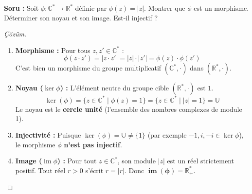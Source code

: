 \documentclass[12pt,a4paper]{report}
\begin{document}
\vspace{0.4cm}

\begin{tcolorbox}[colback=yellow!5!white,colframe=orange!80!black,title=Soru Tipi 4 : Çekirdek ($\ker$) ve Birebirlik İncelemesi]
\textbf{Soru :} Soit $\phi : \mathbb{C}^* \longrightarrow \mathbb{R}^*$ définie par $\phi(z) = |z|$. Montrer que $\phi$ est un morphisme. Déterminer son noyau et son image. Est-il injectif ?
\end{tcolorbox}

\begin{proof}[Çözüm]
\begin{enumerate}
    \item \textbf{Morphisme :} Pour tous $z, z' \in \mathbb{C}^*$ :
    \[ \phi(z \cdot z') = |z \cdot z'| = |z| \cdot |z'| = \phi(z) \cdot \phi(z') \]
    C'est bien un morphisme du groupe multiplicatif $(\mathbb{C}^*, \cdot)$ dans $(\mathbb{R}^*, \cdot)$.
    
    \item \textbf{Noyau ($\ker \phi$) :} L'élément neutre du groupe cible $(\mathbb{R}^*, \cdot)$ est $1$.
    \[ \ker(\phi) = \{ z \in \mathbb{C}^* \mid \phi(z) = 1 \} = \{ z \in \mathbb{C}^* \mid |z| = 1 \} = \mathbf{\mathbb{U}} \]
    Le noyau est le \textbf{cercle unité} (l'ensemble des nombres complexes de module 1).
    
    \item \textbf{Injectivité :} Puisque $\ker(\phi) = \mathbb{U} \neq \{1\}$ (par exemple $-1, i, -i \in \ker \phi$), le morphisme $\phi$ \textbf{n'est pas injectif}.
    
    \item \textbf{Image ($\operatorname{im} \phi$) :} Pour tout $z \in \mathbb{C}^*$, son module $|z|$ est un réel strictement positif. Tout réel $r > 0$ s'écrit $r = |r|$. Donc $\mathbf{\operatorname{im}(\phi) = \mathbb{R}_+^*}$.
\end{enumerate}
\end{proof}
\end{document}
